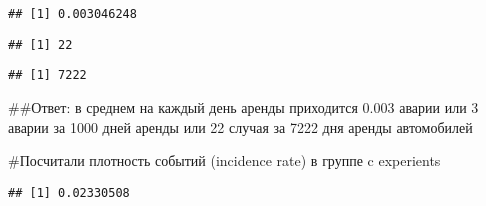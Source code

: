 \documentclass[
]{article}
\newenvironment{Shaded}{\begin{snugshade}}{\end{snugshade}}
\newcommand{\FunctionTok}[1]{\textcolor[rgb]{0.13,0.29,0.53}{\textbf{#1}}}
\newcommand{\NormalTok}[1]{#1}
\newcommand{\OtherTok}[1]{\textcolor[rgb]{0.56,0.35,0.01}{#1}}
\newcommand{\SpecialCharTok}[1]{\textcolor[rgb]{0.81,0.36,0.00}{\textbf{#1}}}
\newcommand{\StringTok}[1]{\textcolor[rgb]{0.31,0.60,0.02}{#1}}
\begin{document}
\begin{verbatim}
## [1] 0.003046248
\end{verbatim}

\begin{Shaded}
\end{Shaded}

\begin{verbatim}
## [1] 22
\end{verbatim}

\begin{Shaded}
\end{Shaded}

\begin{verbatim}
## [1] 7222
\end{verbatim}

\#\#Ответ: в среднем на каждый день аренды приходится 0.003 аварии или 3
аварии за 1000 дней аренды или 22 случая за 7222 дня аренды автомобилей

\#Посчитали плотность событий (incidence rate) в группе c experients

\begin{Shaded}
\end{Shaded}

\begin{verbatim}
## [1] 0.02330508
\end{verbatim}
\end{document}
